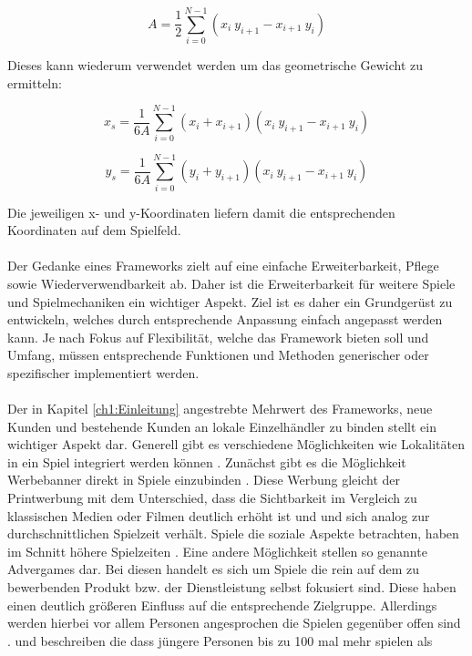 \begin{equation}
A = \frac{1}{2}\sum_{i=0}^{N-1} (x_i\ y_{i+1} - x_{i+1}\ y_i)
\end{equation}

Dieses kann wiederum verwendet werden um das geometrische Gewicht zu ermitteln:

\begin{equation}
x_s = \frac{1}{6A}\sum_{i=0}^{N-1}(x_i+x_{i+1})(x_i\ y_{i+1} - x_{i+1}\ y_i)
\end{equation}

\begin{equation}
y_s = \frac{1}{6A}\sum_{i=0}^{N-1}(y_i+y_{i+1})(x_i\ y_{i+1} - x_{i+1}\ y_i)
\end{equation}

Die jeweiligen x- und y-Koordinaten liefern damit die entsprechenden Koordinaten auf dem Spielfeld.
\\\\
Der Gedanke eines Frameworks zielt auf eine einfache Erweiterbarkeit, Pflege sowie Wiederverwendbarkeit ab. Daher ist die Erweiterbarkeit für weitere Spiele und Spielmechaniken ein wichtiger Aspekt. Ziel ist es daher ein Grundgerüst zu entwickeln, welches durch entsprechende Anpassung einfach angepasst werden kann.
Je nach Fokus auf Flexibilität, welche das Framework bieten soll und Umfang, müssen entsprechende Funktionen und Methoden generischer oder spezifischer implementiert werden.
\\\\
Der in Kapitel \ref{ch1:Einleitung} angestrebte Mehrwert des Frameworks, neue Kunden und bestehende Kunden an lokale Einzelhändler zu binden stellt ein wichtiger Aspekt dar. Generell gibt es verschiedene Möglichkeiten wie Lokalitäten in ein Spiel integriert werden können \cite{Nelson.2002}.
Zunächst gibt es die Möglichkeit Werbebanner direkt in Spiele einzubinden \cite{Nelson.2004}. Diese Werbung gleicht der Printwerbung mit dem Unterschied, dass die Sichtbarkeit im Vergleich zu klassischen Medien oder Filmen deutlich erhöht ist und und sich analog zur durchschnittlichen Spielzeit verhält. Spiele die soziale Aspekte betrachten, haben im Schnitt höhere Spielzeiten \cite{Ducheneaut.2006}.
Eine andere Möglichkeit stellen so genannte Advergames dar. Bei diesen handelt es sich um Spiele die rein auf dem zu bewerbenden Produkt bzw. der Dienstleistung selbst fokusiert sind. Diese haben einen deutlich größeren Einfluss auf die entsprechende Zielgruppe. Allerdings werden hierbei vor allem Personen angesprochen die Spielen gegenüber offen sind \cite{Winkler.2006}. \textcite{Chen.2001} und \textcite{Dahl.2009} beschreiben die dass jüngere Personen bis zu 100 mal mehr spielen als 




